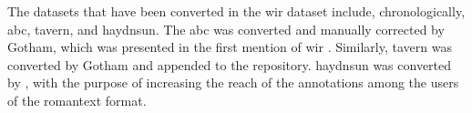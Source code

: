
The datasets that have been converted in the \gls{wir}
dataset include, chronologically, \gls{abc}, \gls{tavern},
and \gls{haydnsun}. The \gls{abc} was converted and manually
corrected by Gotham, which was presented in the first
mention of \gls{wir} \parencite{gotham2019romantext}.
Similarly, \gls{tavern} was converted by Gotham and appended
to the repository. \gls{haydnsun} was converted by
\myself{}, with the purpose of increasing the reach of the
annotations among the users of the \gls{romantext} format.

